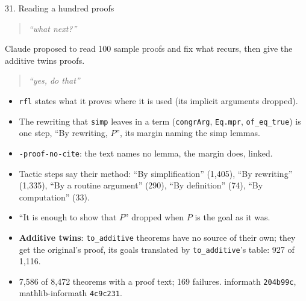 \documentclass[10pt,aspectratio=169]{beamer}
\newcommand{\ok}[1]{\textcolor{good}{#1}}
\newcommand{\commit}[1]{\texttt{\footnotesize #1}}
\newcommand{\prompt}[1]{\begin{quote}\small\itshape ``#1''\end{quote}}
\begin{document}
\begin{frame}{31. Reading a hundred proofs}
  \footnotesize
  \prompt{what next?} Claude proposed to read 100 sample proofs and fix what recurs, then give
  the additive twins proofs. \prompt{yes, do that}
  \begin{itemize}
    \item \texttt{rfl} states what it proves where it is used (its implicit arguments dropped).
    \item The rewriting that \texttt{simp} leaves in a term (\texttt{congrArg}, \texttt{Eq.mpr},
          \texttt{of\_eq\_true}) is one step, \ok{``By rewriting, $P$''}, its margin naming the
          simp lemmas.
    \item \texttt{-proof-no-cite}: the text names no lemma, the margin does, linked.
    \item Tactic steps say their method: ``By simplification'' (1,405), ``By rewriting''
          (1,335), ``By a routine argument'' (290), ``By definition'' (74), ``By computation'' (33).
    \item ``It is enough to show that $P$'' dropped when $P$ is the goal as it was.
    \item \textbf{Additive twins}: \texttt{to\_additive} theorems have no source of their own;
          they get the original's proof, its goals translated by \texttt{to\_additive}'s table:
          927 of 1,116.
    \item 7,586 of 8,472 theorems with a proof text; 169 failures.
          informath \commit{204b99c}, mathlib-informath \commit{4c9c231}.
  \end{itemize}
\end{frame}
\end{document}
